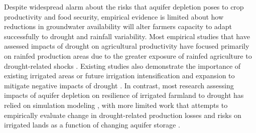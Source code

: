 \documentclass[
]{article}
\begin{document}
Despite widespread alarm about the risks that aquifer depletion poses to crop productivity and food security, empirical evidence is limited about how reductions in groundwater availability will alter farmers capacity to adapt successfully to drought and rainfall variability. Most empirical studies that have assessed impacts of drought on agricultural productivity have focused primarily on rainfed production areas due to the greater exposure of rainfed agriculture to drought-related shocks \citep{schlenker2009nonlinear, lobell2014greater, schlenker2010robust, zhou2020connections, borgomeo2020impact}. Existing studies also demonstrate the importance of existing irrigated areas or future irrigation intensification and expansion to mitigate negative impacts of drought \citep{kuwayama2019estimating, zipper2016drought, zhu2022untangling, zhu2022warming, lu2020mapping, davis2019sensitivity, li2018changes}. In contrast, most research assessing impacts of aquifer depletion on resilience of irrigated farmland to drought has relied on simulation modeling \citep{foster2015well, cotterman2018groundwater, kahil2015modeling, yoon2021coupled, rad2020mod}, with more limited work that attempts to empirically evaluate change in drought-related production losses and risks on irrigated lands as a function of changing aquifer storage \citep{jain2021groundwater, suter2021depletion}.
\end{document}
